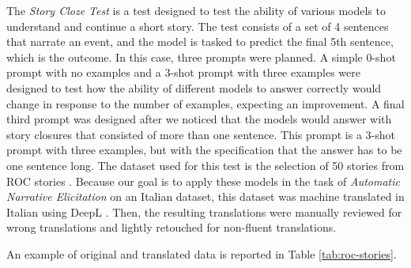 The \emph{Story Cloze Test} \cite{mostafazadeh2016corpus} is a test designed to test the ability of various models to understand and continue a short story. The test consists of a set of 4 sentences that narrate an event, and the model is tasked to predict the final 5th sentence, which is the outcome. In this case, three prompts were planned. A simple 0-shot prompt with no examples and a 3-shot prompt with three examples were designed to test how the ability of different models to answer correctly would change in response to the number of examples, expecting an improvement. A final third prompt was designed after we noticed that the models would answer with story closures that consisted of more than one sentence. This prompt is a 3-shot prompt with three examples, but with the specification that the answer has to be one sentence long. The dataset used for this test is the selection of 50 stories from ROC stories \cite{mostafazadeh2016corpus}. Because our goal is to apply these models in the task of  \emph{Automatic Narrative Elicitation} on an Italian dataset, this dataset was machine translated in Italian using DeepL \cite{deepl}. Then, the resulting translations were manually reviewed for wrong translations and lightly retouched for non-fluent translations.

An example of original and translated data is reported in Table \ref{tab:roc-stories}.

